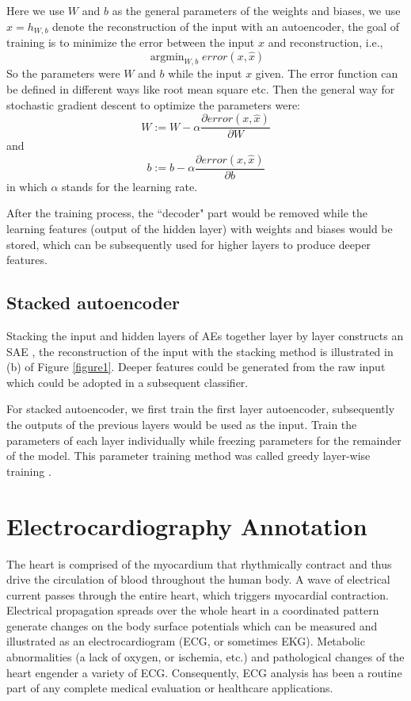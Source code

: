 \documentclass{bmcart}
\DeclareMathOperator*{\argmin}{argmin}
\begin{document}
Here we use $W$ and $b$ as the general parameters of the weights and biases, we use  $\hat{x}=h_{W,b}$ denote the reconstruction of the input with an autoencoder, the goal of training is to minimize the error between the input $x$ and reconstruction, i.e.,
\begin{equation}
 \mathop{\argmin}_{W,b}{error(x,\hat{x})}
\end{equation}
So the parameters were $W$ and $b$ while the input $x$  given. The error function can be defined in different ways like root mean square etc. Then the general way for stochastic gradient descent to optimize the parameters were:
\begin{equation}
W := W - \alpha \frac{\partial error(x, \hat{x})}{\partial W}
\end{equation}
and
\begin{equation}
b := b - \alpha \frac{\partial error(x, \hat{x})}{\partial b}
\end{equation}
in which $\alpha $ stands for the learning rate. 



After the training process, the ``decoder" part would be removed while the learning features (output of the hidden layer) with weights and biases would be stored, which can be subsequently used for higher layers to produce deeper features.

\subsection*{Stacked autoencoder}
Stacking the input and hidden layers of AEs together layer by layer constructs an SAE \cite{chen2014deep}, the reconstruction of the input with the stacking method is illustrated in (b) of Figure \ref{figure1}. Deeper features could be generated from the raw input which could be adopted in a subsequent classifier. 

For stacked autoencoder, we first train the first layer autoencoder, subsequently the outputs of the previous layers would be used as the input. Train the parameters of each layer individually while freezing parameters for the remainder of the model. This parameter training method was called greedy layer-wise training \cite{bengio2007greedy}.

\section*{Electrocardiography Annotation}
The heart is comprised of the myocardium that rhythmically contract and thus drive the circulation of blood throughout the human body. A wave of electrical current passes through the entire heart, which triggers myocardial contraction\cite{clifford}. Electrical propagation spreads over the whole heart in a coordinated pattern generate changes on the body surface potentials which can be measured and illustrated as an electrocardiogram (ECG, or sometimes EKG). Metabolic abnormalities (a lack of oxygen, or ischemia, etc.) and pathological changes of the heart engender a variety of ECG. Consequently, ECG analysis has been a routine part of any complete medical evaluation or healthcare applications. 
\end{document}
